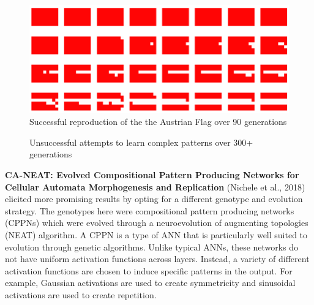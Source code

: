 \begin{figure}[!h]
    \centering
    \includegraphics[width=5in]{related_works/austria-flag.png}
    \caption{Successful reproduction of the the Austrian Flag over 90 generations \cite{elmenreich2011evolving}}
    \label{fig:austria-flag}
\end{figure}

\begin{figure}[htp] 
    \centering
    \hfill%
    \caption{Unsuccessful attempts to learn complex patterns over 300+ generations}
\end{figure}

\raggedbottom
\pagebreak

\noindent
\textbf{CA-NEAT: Evolved Compositional Pattern Producing Networks for Cellular Automata Morphogenesis and Replication} (Nichele et al., 2018) \cite{nichele2017neat} elicited more promising results by opting for a different genotype and evolution strategy.
The genotypes here were compositional pattern producing networks (CPPNs) which were evolved through a neuroevolution of augmenting topologies (NEAT) algorithm.
A CPPN is a type of ANN that is particularly well suited to evolution through genetic algorithms.
Unlike typical ANNs, these networks do not have uniform activation functions across layers.
Instead, a variety of different activation functions are chosen to induce specific patterns in the output.
For example, Gaussian activations are used to create symmetricity and sinusoidal activations are used to create repetition.\\

